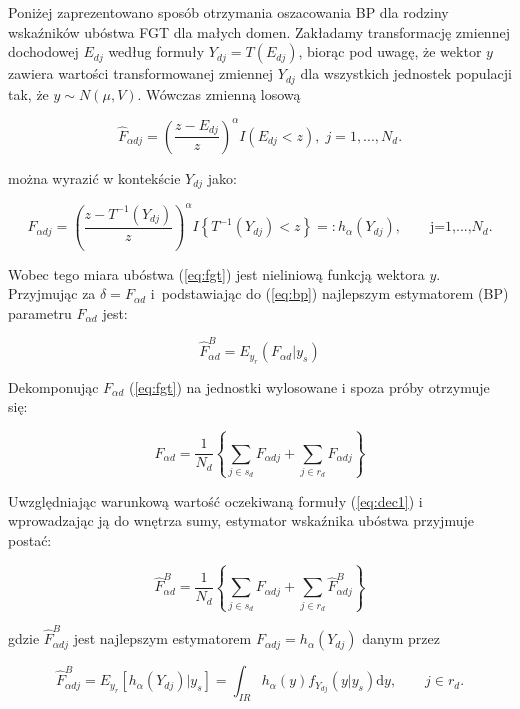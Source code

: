 Poniżej zaprezentowano sposób otrzymania oszacowania BP dla rodziny wskaźników ubóstwa FGT dla małych domen. Zakładamy transformację zmiennej dochodowej $E_{dj}$ według formuły $Y_{dj}=T(E_{dj})$, biorąc pod uwagę, że wektor $y$ zawiera wartości transformowanej zmiennej $Y_{dj}$ dla wszystkich jednostek populacji tak, że $y \sim N(\mu, V)$. Wówczas zmienną losową 

\begin{equation}
\hat{F}_{\alpha d j}=\left(\frac{z - E_{dj}}{z}\right)^{\alpha}I(E_{dj}<z),\; j=1, ..., N_d.
\label{eq:fgt2}
\end{equation}

można wyrazić w kontekście $Y_{dj}$ jako:

\begin{equation}
F_{\alpha d j}=\left(\frac{z-T^{-1}(Y_{dj})}{z}\right)^{\alpha}I\left\{T^{-1}(Y_{dj})<z\right\}=:h_{\alpha}(Y_{dj}),\qquad \text{j=1,...,$N_d$}.
\end{equation}

Wobec tego miara ubóstwa (\ref{eq:fgt}) jest nieliniową funkcją wektora $y$. Przyjmując za $\delta=F_{\alpha d}$ i~podstawiając do (\ref{eq:bp}) najlepszym estymatorem (BP) parametru $F_{\alpha d}$ jest:

\begin{equation}
\hat{F}^{B}_{\alpha d}=E_{y_{r}}(F_{\alpha d}|y_s)
\label{eq:bpexp}
\end{equation}

Dekomponując $F_{\alpha d}$ (\ref{eq:fgt}) na jednostki wylosowane i spoza próby otrzymuje się:

\begin{equation}
F_{\alpha d}=\frac{1}{N_d}\left\{\sum\limits_{j \in s_d}{F_{\alpha dj}}+\sum\limits_{j \in r_d}{F_{\alpha dj}}\right\}
\label{eq:dec1}
\end{equation}

Uwzględniając warunkową wartość oczekiwaną formuły (\ref{eq:dec1}) i wprowadzając ją do wnętrza sumy, estymator wskaźnika ubóstwa przyjmuje postać:

\begin{equation}
\hat{F}^B_{\alpha d}=\frac{1}{N_d}\left\{\sum\limits_{j \in s_d}{F_{\alpha dj}}+\sum\limits_{j \in r_d}{\hat{F}^B_{\alpha dj}}\right\}
\label{eq:dec2}
\end{equation}

gdzie $\hat{F}^B_{\alpha dj}$ jest najlepszym estymatorem $F_{\alpha d j}=h_{\alpha}(Y_{dj})$ danym przez

\begin{equation}
\hat{F}^B_{\alpha dj}=E_{y_{r}}[h_{\alpha}(Y_{dj})|y_s]=\int_{IR}{h_{\alpha}(y)f_{Y_{dj}}(y|y_s)}\text{d}y,\qquad j \in r_d.
\label{eq:bpcalka}
\end{equation}


